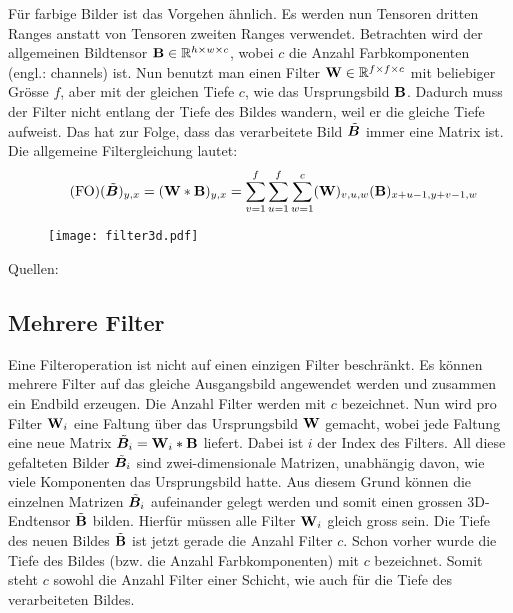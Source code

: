 \para{}
Für farbige Bilder ist das Vorgehen ähnlich. Es werden nun
Tensoren dritten Ranges anstatt von Tensoren zweiten Ranges verwendet.
Betrachten wird der allgemeinen Bildtensor $\mathbf{B} \in \mathbb{R}^{h \times w
  \times c}$, wobei $c$ die Anzahl Farbkomponenten (engl.: channels) ist.
Nun benutzt man einen Filter $\mathbf{W} \in \mathbb{R}^{f \times f \times c}$ mit beliebiger Grösse
$f$, aber mit der gleichen Tiefe $c$, wie das Ursprungsbild $\mathbf{B}$.
Dadurch muss der Filter nicht entlang der Tiefe des Bildes wandern, weil er
die gleiche Tiefe aufweist. Das hat zur Folge, dass das verarbeitete
Bild $\tilde{\bm{B}}$ immer eine Matrix ist.
Die allgemeine Filtergleichung lautet:
\\
\begin{equation}\tag{FO}
  (\tilde{\bm{B}})_{y,x} = (\mathbf{W} * \mathbf{B})_{y,x} = \sum_{v=1}^{f} \sum_{u=1}^{f} \sum_{w=1}^c (\mathbf{W})_{v,u,w} (\mathbf{B})_{x+u-1,y+v-1,w}
\end{equation}
\para{}
\begin{figure}[h!]
  \centering
  \centering
  \texttt{[image: filter3d.pdf]}
  \label{fig:filter3d}
\end{figure}

\para{}
Quellen: \cite{Goodfellow-et-al-2016} \cite{deeplearning.ai:cnn} \cite{wiki:cnn}

\subsection{Mehrere Filter}
Eine Filteroperation ist nicht auf einen einzigen Filter beschränkt. Es können
mehrere Filter auf das gleiche Ausgangsbild angewendet werden und zusammen ein
Endbild erzeugen.
\para{}
Die Anzahl Filter werden mit $c$ bezeichnet.
Nun wird pro Filter $\mathbf{W}_i$ eine Faltung über das Ursprungsbild $\mathbf{W}$ gemacht, wobei
jede Faltung eine neue Matrix $\tilde{\bm{B}}_i = \mathbf{W}_i * \mathbf{B}$ liefert.
Dabei ist $i$ der Index des Filters. All diese gefalteten Bilder
$\tilde{\bm{B}}_i$ sind zwei-dimensionale Matrizen, unabhängig davon, wie viele
Komponenten das Ursprungsbild hatte. Aus diesem Grund können die einzelnen
Matrizen $\tilde{\bm{B}}_i$ aufeinander gelegt werden und somit einen grossen 3D-Endtensor
$\tilde{\mathbf{B}}$ bilden.
Hierfür müssen alle Filter $\mathbf{W}_i$ gleich gross sein.
Die Tiefe des neuen Bildes $\tilde{\mathbf{B}}$ ist jetzt gerade die Anzahl Filter $c$.
Schon vorher wurde die Tiefe des Bildes (bzw. die Anzahl
Farbkomponenten) mit $c$ bezeichnet. Somit steht $c$ sowohl die Anzahl Filter
einer Schicht, wie auch für die Tiefe des verarbeiteten Bildes.

